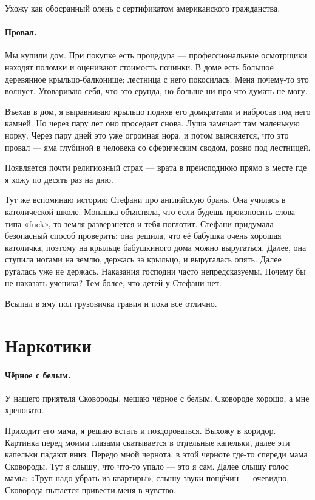 \documentclass{book}
\begin{document}
Ухожу как обосранный олень с сертификатом американского гражданства.

\paragraph{Провал.}
Мы купили дом.
При покупке есть процедура --- профессиональные осмотрщики находят поломки и оценивают стоимость починки.
В доме есть большое деревянное крыльцо-балконище;
лестница с него покосилась.
Меня почему-то это волнует.
Уговариваю себя, что это ерунда, но больше ни про что думать не могу.

Въехав в дом, я выравниваю крыльцо подняв его домкратами и набросав под него камней.
Но через пару лет оно проседает снова.
Луша замечает там маленькую норку.
Через пару дней это уже огромная нора, и потом выясняется, что это провал ---
яма глубиной в человека со сферическим сводом, ровно под лестницей.

Появляется почти религиозный страх --- врата в преисподнюю прямо в месте где я хожу по десять раз на дню.

Тут же вспоминаю историю Стефани про английскую брань.
Она училась в католической школе.
Монашка объясняла, что если будешь произносить слова типа «fuck», то земля разверзнется и тебя поглотит.
Стефани придумала безопасный способ проверить:
она решила, что её бабушка очень хорошая католичка,
поэтому на крыльце бабушкиного дома можно выругаться.
Далее, она ступила ногами на землю, держась за крыльцо, и выругалась опять.
Далее ругалась уже не держась.
Наказания господни часто непредсказуемы.
Почему бы не наказать ученика?
Тем более, что детей у Стефани нет.

Всыпал в яму пол грузовичка гравия и пока всё отлично.

\section*{Наркотики}

\paragraph{Чёрное с белым.}
У нашего приятеля Сковороды, мешаю чёрное с белым.
Сковороде хорошо, а мне хреновато.

Приходит его мама, я решаю встать и поздороваться.
Выхожу в коридор.
Картинка перед моими глазами скатывается в отдельные капельки, далее эти капельки падают вниз.
Передо мной чернота, в этой черноте где-то спереди мама Сковороды.
Тут я слышу, что что-то упало --- это я сам.
Далее слышу голос мамы: «Труп надо убрать из квартиры»,
слышу звуки пощёчин --- очевидно, Сковорода пытается привести меня в чувство.
\end{document}
